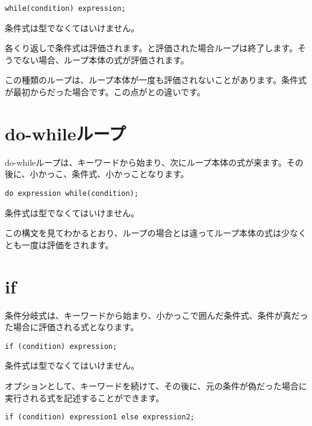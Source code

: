 \begin{lstlisting}
while(condition) expression;
\end{lstlisting}

条件式は型でなくてはいけません。

各くり返しで条件式は評価されます。と評価された場合ループは終了します。そうでない場合、ループ本体の式が評価されます。


この種類のループは、ループ本体が一度も評価されないことがあります。条件式が最初からだった場合です。この点がとの違いです。

\section{do-whileループ}
\label{expression-do-while}

do-whileループは、キーワードから始まり、次にループ本体の式が来ます。その後に、小かっこ\expr{(}、条件式、小かっこ\expr{)}となります。

\begin{lstlisting}
do expression while(condition);
\end{lstlisting}

条件式は型でなくてはいけません。

この構文を見てわかるとおり、ループの場合とは違ってループ本体の式は少なくとも一度は評価をされます。

\section{if}
\label{expression-if}

条件分岐式は、キーワードから始まり、小かっこ\expr{()}で囲んだ条件式、条件が真だった場合に評価される式となります。

\begin{lstlisting}
if (condition) expression;
\end{lstlisting}

条件式は型でなくてはいけません。

オプションとして、キーワードを続けて、その後に、元の条件が偽だった場合に実行される式を記述することができます。

\begin{lstlisting}
if (condition) expression1 else expression2;
\end{lstlisting}

